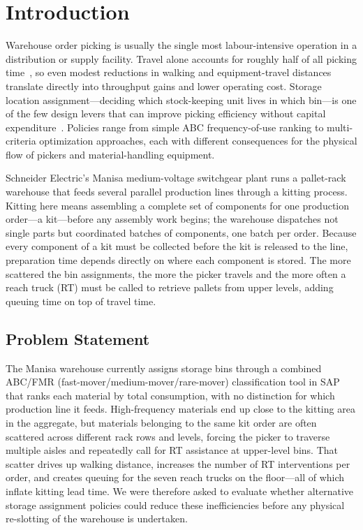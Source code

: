 \section{Introduction}\label{sec:intro}

Warehouse order picking is usually the single most labour-intensive operation
in a distribution or supply facility.
Travel alone accounts for roughly half of all picking time~\cite{dekoster2007},
so even modest reductions in walking and equipment-travel distances translate
directly into throughput gains and lower operating cost.
Storage location assignment---deciding which stock-keeping unit lives in which
bin---is one of the few design levers that can improve picking efficiency
without capital expenditure~\cite{gu2007,bartholdi2014}.
Policies range from simple ABC frequency-of-use ranking to multi-criteria
optimization approaches, each with different consequences for the physical
flow of pickers and material-handling equipment.

Schneider Electric's Manisa medium-voltage switchgear plant runs a
pallet-rack warehouse that feeds several parallel production lines through
a kitting process.
Kitting here means assembling a complete set of components for one production
order---a kit---before any assembly work begins; the warehouse dispatches not
single parts but coordinated batches of components, one batch per order.
Because every component of a kit must be collected before the kit is released
to the line, preparation time depends directly on where each component is
stored.
The more scattered the bin assignments, the more the picker travels and the
more often a reach truck (RT) must be called to retrieve pallets from upper
levels, adding queuing time on top of travel time.

\subsection{Problem Statement}

The Manisa warehouse currently assigns storage bins through a combined
ABC/FMR (fast-mover/medium-mover/rare-mover) classification tool in SAP
that ranks each material by total consumption, with no distinction for which
production line it feeds.
High-frequency materials end up close to the kitting area in the aggregate,
but materials belonging to the same kit order are often scattered across
different rack rows and levels, forcing the picker to traverse multiple aisles
and repeatedly call for RT assistance at upper-level bins.
That scatter drives up walking distance, increases the number of RT
interventions per order, and creates queuing for the seven reach trucks on
the floor---all of which inflate kitting lead time.
We were therefore asked to evaluate whether alternative storage assignment
policies could reduce these inefficiencies before any physical re-slotting of
the warehouse is undertaken.

